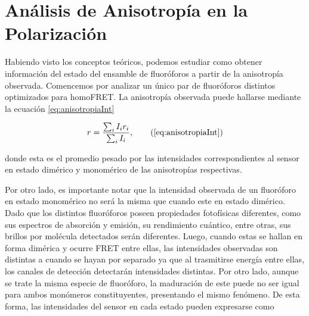 


\section{Análisis de Anisotropía en la Polarización}

Habiendo visto los conceptos teóricos, podemos estudiar como obtener información del estado del ensamble de fluoróforos a partir de la anisotropía observada. Comencemos por analizar un único par de fluoróforos distintos optimizados para homoFRET. La anisotropía observada puede hallarse mediante la ecuación \ref{eq:anisotropiaInt}

\begin{equation}
r = \frac{\sum_i I_i r_i}{\sum_i I_i}, \tag{\ref{eq:anisotropiaInt}}
\end{equation}

\noindent donde esta es el promedio pesado por las intensidades correspondientes al sensor en estado dimérico y monomérico de las anisotropías respectivas. 

Por otro lado, es importante notar que la intensidad observada de un fluoróforo en estado monomérico no será la misma que cuando este en estado dimérico. Dado que los distintos fluoróforos poseen propiedades fotofísicas diferentes, como sus espectros de absorción y emisión, su rendimiento cuántico, entre otras, sus brillos por molécula detectados serán diferentes. Luego, cuando estas se hallan en forma dimérica y ocurre FRET entre ellas, las intensidades observadas son distintas a cuando se hayan por separado ya que al trasmitirse energía entre ellas, los canales de detección detectarán intensidades distintas. Por otro lado, aunque se trate la misma especie de fluoróforo, la maduración de este puede no ser igual para ambos monómeros constituyentes, presentando el mismo fenómeno. De esta forma, las intensidades del sensor en cada estado pueden expresarse como


